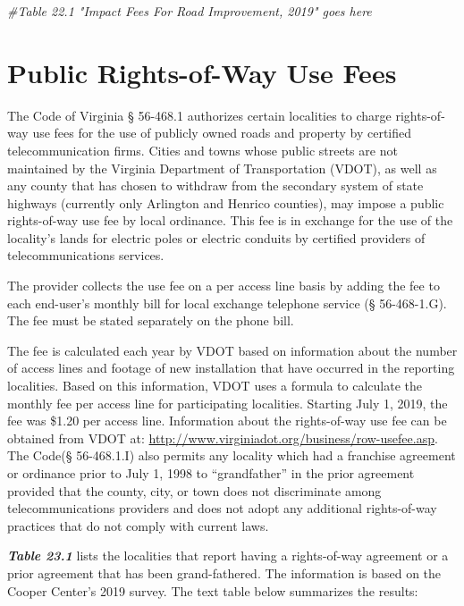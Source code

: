 \documentclass[
]{book}
\newenvironment{Shaded}{\begin{snugshade}}{\end{snugshade}}
\newcommand{\CommentTok}[1]{\textcolor[rgb]{0.56,0.35,0.01}{\textit{#1}}}
\begin{document}
\begin{Shaded}
\begin{Highlighting}[]
\CommentTok{\#Table 22.1 "Impact Fees For Road Improvement, 2019" goes here}
\end{Highlighting}
\end{Shaded}

\hypertarget{public-rights-of-way-use-fees}{%
\chapter{Public Rights-of-Way Use Fees}\label{public-rights-of-way-use-fees}}

The Code of Virginia § 56-468.1 authorizes certain localities to charge rights-of-way use fees for the use of publicly owned roads and property by certified telecommunication firms. Cities and towns whose public streets are not maintained by the Virginia Department of Transportation (VDOT), as well as any county that has chosen to withdraw from the secondary system of state highways (currently only Arlington and Henrico counties), may impose a public rights-of-way use fee by local ordinance. This fee is in exchange for the use of the locality's lands for electric poles or electric conduits by certified providers of telecommunications services.

The provider collects the use fee on a per access line basis by adding the fee to each end-user's monthly bill for local exchange telephone service (§ 56-468-1.G). The fee must be stated separately on the phone bill.

The fee is calculated each year by VDOT based on information about the number of access lines and footage of new installation that have occurred in the reporting localities. Based on this information, VDOT uses a formula to calculate the monthly fee per access line for participating localities. Starting July 1, 2019, the fee was \$1.20 per access line. Information about the rights-of-way use fee can be obtained from VDOT at: \url{http://www.virginiadot.org/business/row-usefee.asp}. The Code(§ 56-468.1.I) also permits any locality which had a franchise agreement or ordinance prior to July 1, 1998 to ``grandfather'' in the prior agreement provided that the county, city, or town does not discriminate among telecommunications providers and does not adopt any additional rights-of-way practices that do not comply with current laws.

\textbf{\emph{Table 23.1}} lists the localities that report having a rights-of-way agreement or a prior agreement that has been grand-fathered. The information is based on the Cooper Center's 2019 survey. The text table below summarizes the results:
\end{document}
